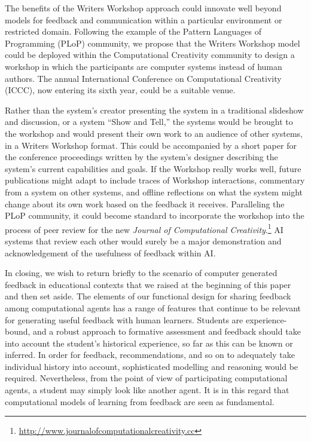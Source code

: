 
The benefits of the Writers Workshop approach could innovate well beyond models for 
feedback and communication within a particular environment or restricted domain. 
Following the example of the Pattern Languages of Programming (PLoP) community, we propose that the Writers Workshop model could be deployed
within the Computational Creativity community to design a workshop in
which the participants are computer systems instead of human authors.
The annual International Conference on Computational Creativity
(ICCC), now entering its sixth year, could be a suitable venue. 

Rather than the system's creator presenting the system in a
traditional slideshow and discussion, or a system ``Show and Tell,''
the systems would be brought to the workshop and would present their
own work to an audience of other systems, in a Writers Workshop
format.  This could be accompanied by a short paper for the conference
proceedings written by the system's designer describing the system's
current capabilities and goals.  
%
If the Workshop really works well, future publications might adapt to include
traces of Workshop interactions, commentary from a system on
other systems, and offline reflections on what the system might change
about its own work based on the feedback it receives.  Paralleling the PLoP
community, it could become standard to incorporate the workshop
into the process of peer review for the new \emph{Journal of
  Computational Creativity}.\footnote{\url{http://www.journalofcomputationalcreativity.cc}} AI systems that review each other would surely be a major demonstration and acknowledgement of the usefulness of feedback within AI.

In closing, we wish to return briefly to the scenario of computer
generated feedback in educational contexts that we raised at the
beginning of this paper and then set aside.  The elements of our
functional design for sharing feedback among computational agents has
a range of features that continue to be relevant for generating useful
feedback with human learners.  Students are experience-bound, and a
robust approach to formative assessment and feedback should take into
account the student's historical experience, so far as this can be
known or inferred.  In order for feedback, recommendations, and so on to
adequately take individual history into account, sophisticated modelling and
reasoning would be required.
Nevertheless, from the point of view of participating computational
agents, a student may simply look like another agent.  It is in this
regard that computational models of learning from feedback are seen
as fundamental.

